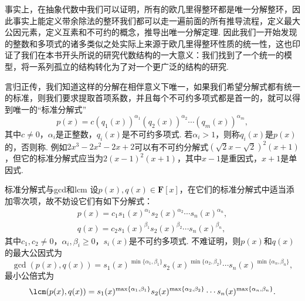 事实上，在抽象代数中我们可以证明，所有的欧几里得整环都是唯一分解整环，因此事实上能定义带余除法的整环我们都可以走一遍前面的所有推导流程，定义最大公因元素，定义互素和不可约的概念，推导出唯一分解定理. 因此我们一开始发现的整数和多项式的诸多类似之处实际上来源于欧几里得整环性质的统一性，这也印证了我们在本书开头所说的研究代数结构的一大意义：我们找到了一个统一的模型，将一系列孤立的结构转化为了对一个更广泛的结构的研究.

言归正传，我们知道这样的分解在相伴意义下唯一，如果我们希望分解式都有统一的标准，则我们要求提取首项系数，并且每个不可约多项式都是首一的，就可以得到唯一的``标准分解式''
\[p(x)=c(q_1(x))^{\alpha_1}(q_2(x))^{\alpha_2}\cdots(q_m(x))^{\alpha_m},\]
其中$c\neq 0$，$\alpha_i$是正整数，$q_i(x)$是不可约多项式. 若$\alpha_i>1$，则称$q_i(x)$是$p(x)$的，否则称. 例如$2x^3-2x^2-2x+2$可以有不可约分解式$(\sqrt{2}x-\sqrt{2})^2(x+1)$，但它的标准分解式应当为$2(x-1)^2(x+1)$，其中$x-1$是重因式，$x+1$是单因式.
\begin{example}{}{标准分解式与gcd和lcm}
    设$p(x),q(x)\in\mathbf{F}[x]$，在它们的标准分解式中适当添加零次项，故不妨设它们有如下分解式：
    \begin{gather*}
        p(x)=c_1s_1(x)^{\alpha_1}s_2(x)^{\alpha_2}\cdots s_n(x)^{\alpha_n},\\
        q(x)=c_2s_1(x)^{\beta_1}s_2(x)^{\beta_2}\cdots s_n(x)^{\beta_n},
    \end{gather*}
    其中$c_1,c_2\neq 0$，$\alpha_i,\beta_i\geqslant 0$，$s_i(x)$是不可约多项式. 不难证明，则$p(x)$和$q(x)$的最大公因式为
    \[\gcd(p(x),q(x))=s_1(x)^{\min\{\alpha_1,\beta_1\}}s_2(x)^{\min\{\alpha_2,\beta_2\}}\cdots s_n(x)^{\min\{\alpha_n,\beta_n\}},\]
    最小公倍式为
    \[\lcm(p(x),q(x))=s_1(x)^{\max\{\alpha_1,\beta_1\}}s_2(x)^{\max\{\alpha_2,\beta_2\}}\cdots s_n(x)^{\max\{\alpha_n,\beta_n\}}.\]
\end{example}

